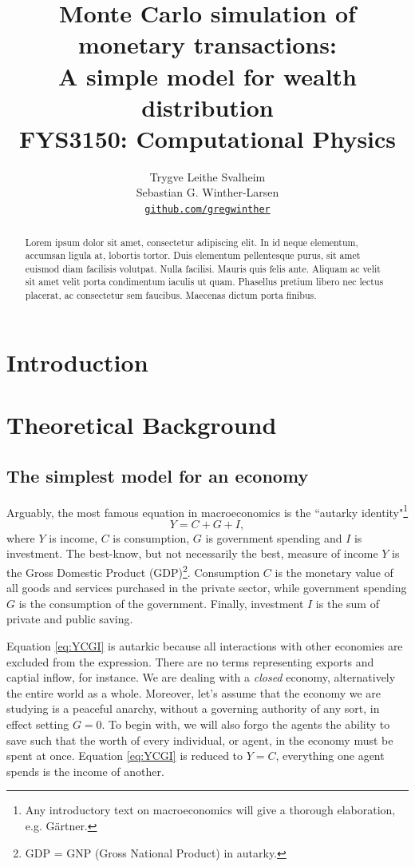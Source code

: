 \documentclass[10pt, a4paper]{amsart}
\title[Simulation of monetary transactions]{Monte Carlo simulation of monetary transactions: \\
\normalsize{A simple model for wealth distribution} \\
  \hrulefill\small{ FYS3150: Computational Physics }\hrulefill}
\author[Svalheim \& Winther-Larsen]{Trygve Leithe Svalheim \\
   Sebastian G. Winther-Larsen \\
  \href{https://github.com/gregwinther/FYS3150/}{\texttt{github.com/gregwinther}}}
\begin{document}
\begin{titlepage}
\begin{abstract}
Lorem ipsum dolor sit amet, consectetur adipiscing elit. In id neque elementum, accumsan ligula at, lobortis tortor. Duis elementum pellentesque purus, sit amet euismod diam facilisis volutpat. Nulla facilisi. Mauris quis felis ante. Aliquam ac velit sit amet velit porta condimentum iaculis ut quam. Phasellus pretium libero nec lectus placerat, ac consectetur sem faucibus. Maecenas dictum porta finibus.
\end{abstract}
\maketitle
\tableofcontents
\end{titlepage}

\section{Introduction}


\section{Theoretical Background}
\subsection{The simplest model for an economy}
Arguably, the most famous equation in macroeconomics is the ``autarky identity"\footnote{Any introductory text on macroeconomics will give a thorough elaboration, e.g. Gärtner.}
\begin{equation}
\label{eq:YCGI}
Y = C + G + I,
\end{equation}
where $Y$ is income, $C$ is consumption, $G$ is government spending and $I$ is investment. The best-know, but not necessarily the best, measure of income $Y$ is the Gross Domestic Product (GDP)\footnote{GDP = GNP (Gross National Product) in autarky.}. Consumption $C$ is the monetary value of all goods and services purchased in the private sector, while government spending $G$ is the consumption of the government. Finally, investment $I$ is the sum of private and public saving. 

Equation \ref{eq:YCGI} is autarkic because all interactions with other economies are excluded from the expression. There are no terms representing exports and captial inflow, for instance. We are dealing with a \emph{closed} economy, alternatively the entire world as a whole. Moreover, let's assume that the economy we are studying is a peaceful anarchy, without a governing authority of any sort, in effect setting $G = 0$. To begin with, we will also forgo the agents the ability to save such that the worth of every individual, or agent, in the economy must be spent at once. Equation \ref{eq:YCGI} is reduced to $Y = C$, everything one agent spends is the income of another.
\end{document}
